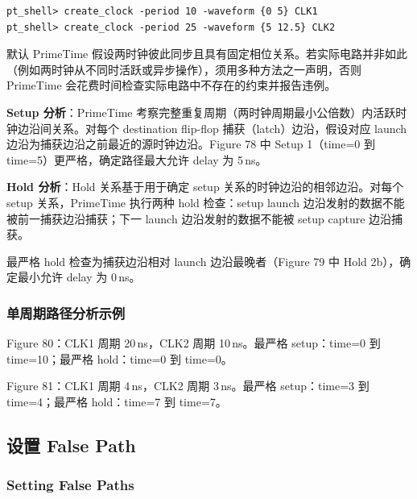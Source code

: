 \begin{lstlisting}
pt_shell> create_clock -period 10 -waveform {0 5} CLK1
pt_shell> create_clock -period 25 -waveform {5 12.5} CLK2
\end{lstlisting}

默认 PrimeTime 假设两时钟彼此同步且具有固定相位关系。若实际电路并非如此（例如两时钟从不同时活跃或异步操作），须用多种方法之一声明，否则 PrimeTime 会花费时间检查实际电路中不存在的约束并报告违例。

\textbf{Setup 分析}：PrimeTime 考察完整重复周期（两时钟周期最小公倍数）内活跃时钟边沿间关系。对每个 destination flip-flop 捕获（latch）边沿，假设对应 launch 边沿为捕获边沿之前最近的源时钟边沿。Figure 78 中 Setup 1（time=0 到 time=5）更严格，确定路径最大允许 delay 为 5\,ns。

\textbf{Hold 分析}：Hold 关系基于用于确定 setup 关系的时钟边沿的相邻边沿。对每个 setup 关系，PrimeTime 执行两种 hold 检查：setup launch 边沿发射的数据不能被前一捕获边沿捕获；下一 launch 边沿发射的数据不能被 setup capture 边沿捕获。


最严格 hold 检查为捕获边沿相对 launch 边沿最晚者（Figure 79 中 Hold 2b），确定最小允许 delay 为 0\,ns。

\subsubsection{单周期路径分析示例}
Figure 80：CLK1 周期 20\,ns，CLK2 周期 10\,ns。最严格 setup：time=0 到 time=10；最严格 hold：time=0 到 time=0。


Figure 81：CLK1 周期 4\,ns，CLK2 周期 3\,ns。最严格 setup：time=3 到 time=4；最严格 hold：time=7 到 time=7。


\subsection{设置 False Path}
\subsubsection*{Setting False Paths}

